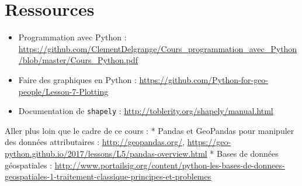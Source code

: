 \documentclass[11pt]{article}
\newcommand{\passthrough}[1]{#1}
\def\tightlist{}
\begin{document}
\hypertarget{ressources}{%
\section{Ressources}\label{ressources}}

\begin{itemize}
\tightlist
\item
  Programmation avec Python :
  \url{https://github.com/ClementDelgrange/Cours_programmation_avec_Python/blob/master/Cours_Python.pdf}
\item
  Faire des graphiques en Python :
  \url{https://github.com/Python-for-geo-people/Lesson-7-Plotting}
\item
  Documentation de \passthrough{\lstinline!shapely!} :
  \url{http://toblerity.org/shapely/manual.html}
\end{itemize}

Aller plus loin que le cadre de ce cours : * Pandas et GeoPandas pour
manipuler des données attributaires : \url{http://geopandas.org/},
\url{https://geo-python.github.io/2017/lessons/L5/pandas-overview.html}
* Bases de données géospatiales :
\url{http://www.portailsig.org/content/python-les-bases-de-donnees-geospatiales-1-traitement-classique-principes-et-problemes}
\end{document}
